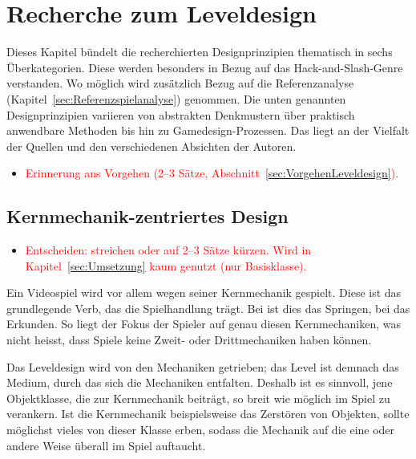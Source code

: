 \documentclass[../Main.tex]{subfiles}
\begin{document}
\section{Recherche zum Leveldesign} \label{sec:Leveldesign}
Dieses Kapitel bündelt die recherchierten Designprinzipien thematisch in sechs Überkategorien. Diese werden besonders in Bezug auf das Hack-and-Slash-Genre verstanden. Wo möglich wird zusätzlich Bezug auf die Referenzanalyse (Kapitel~\ref{sec:Referenzspielanalyse}) genommen. Die unten genannten Designprinzipien variieren von abstrakten Denkmustern über praktisch anwendbare Methoden bis hin zu Gamedesign-Prozessen. Das liegt an der Vielfalt der Quellen und den verschiedenen Absichten der Autoren.
\begin{itemize}[leftmargin=1.5cm]
    \item \textcolor{red}{Erinnerung ans Vorgehen (2--3 Sätze, Abschnitt~\ref{sec:VorgehenLeveldesign}).}
\end{itemize}

\subsection{Kernmechanik-zentriertes Design} \label{sec:Kernmechanik}

\begin{itemize}[leftmargin=1.5cm]
    \item \textcolor{red}{Entscheiden: streichen oder auf 2--3 Sätze kürzen. Wird in Kapitel~\ref{sec:Umsetzung} kaum genutzt (nur Basisklasse).}
\end{itemize}
\begingroup\color{red}Ein Videospiel wird vor allem wegen seiner Kernmechanik gespielt. Diese ist das grundlegende Verb, das die Spielhandlung trägt.\autocite{totten2014architectural} Bei  ist dies das Springen, bei  das Erkunden. So liegt der Fokus der Spieler auf genau diesen Kernmechaniken, was nicht heisst, dass Spiele keine Zweit- oder Drittmechaniken haben können.

Das Leveldesign wird von den Mechaniken getrieben; das Level ist demnach das Medium, durch das sich die Mechaniken entfalten.\autocite{gdc_tenprinciples2010} Deshalb ist es sinnvoll, jene Objektklasse, die zur Kernmechanik beiträgt, so breit wie möglich im Spiel zu verankern. Ist die Kernmechanik beispielsweise das Zerstören von Objekten, sollte möglichst vieles von dieser Klasse erben, sodass die Mechanik auf die eine oder andere Weise überall im Spiel auftaucht.\autocite{gdc_movingmountains2020}
\end{document}
